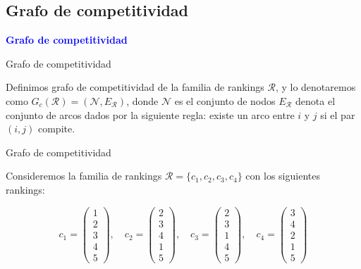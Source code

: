 \documentclass[10pt]{beamer}
\begin{document}
	\subsection{Grafo de competitividad}
	
	\begin{frame}
		\begin{center}
			\Huge\textbf{\textsf{\textcolor{blue}{Grafo de competitividad}}}
		\end{center}
	\end{frame}
	
	\begin{frame}{Grafo de competitividad}
		\begin{defi}
			Definimos grafo de competitividad de la familia de rankings $\mathcal{R}$, y lo denotaremos como $G_c(\mathcal{R}) = (\mathcal{N}, E_\mathcal{R})$, donde $\mathcal{N}$ es el conjunto de nodos $E_\mathcal{R}$ denota el conjunto de arcos dados por la siguiente regla: existe un arco entre $i$ y $j$ si el par $(i,j)$ compite.
		\end{defi}
	\end{frame}
	
	\begin{frame}{Grafo de competitividad}
		\begin{ejemplo}
			Consideremos la familia de rankings $\mathcal{R} = \{c_1, c_2, c_3, c_4\}$ con los siguientes rankings:
			
			\begin{equation*}
			c_1 = \left( \begin{array}{c}
			1 \\
			2 \\
			3 \\
			4 \\
			5
			\end{array} \right), \quad
			c_2 = \left( \begin{array}{c}
			2 \\
			3 \\
			4 \\
			1 \\
			5
			\end{array} \right), \quad
			c_3 = \left( \begin{array}{c}
			2 \\
			3 \\
			1 \\
			4 \\
			5
			\end{array} \right), \quad
			c_4 = \left( \begin{array}{c}
			3 \\
			4 \\
			2 \\
			1 \\
			5
			\end{array} \right)
			\end{equation*}
		
		\end{ejemplo}
	\end{frame}
	
\end{document}
